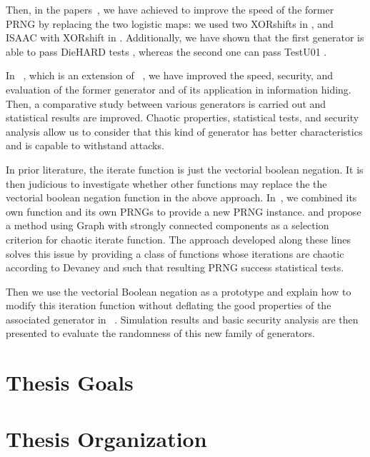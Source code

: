 Then, in the papers~\cite{guyeuxTaiwan10,bgw10:ip}, we have achieved to improve the speed of the former PRNG by replacing the two logistic maps: we used two XORshifts in \cite{guyeuxTaiwan10}, and ISAAC with XORshift in \cite{bgw10:ip}. 
Additionally, we have shown that the first generator is able to pass DieHARD tests \cite{guyeuxTaiwan10}, whereas the second one can pass TestU01 \cite{bgw10:ip}.

In ~\cite{wbg10:ip,bfgw11:ij}, which is an extension of ~\cite{wang2009}, we have improved the speed, security, and evaluation of the former generator and of its application in information hiding. Then, a comparative study between various
generators is carried out and statistical results are improved. Chaotic properties, statistical tests, and security analysis allow us to consider that this kind of generator has better characteristics and is capable to withstand attacks. 

In prior literature, the iterate function is just the vectorial boolean negation. 
It is then judicious to investigate whether other functions may replace the the vectorial boolean negation function in the above approach. In~\cite{bcgw11:ip}, we combined its own function and its
own PRNGs to provide a new PRNG instance. and propose a method using Graph with strongly connected components as a selection criterion for chaotic iterate function. The approach
developed along these lines solves this issue by providing
a class of functions whose iterations are chaotic according
to Devaney and such that resulting PRNG success statistical
tests.

Then we use the vectorial Boolean negation as a
prototype and explain how to modify this iteration function
without deflating the good properties of the associated generator in ~\cite{bfgw11:ip}.
Simulation results and basic security analysis are then presented
to evaluate the randomness of this new family of generators.

\section{Thesis Goals}


\section{Thesis Organization}



